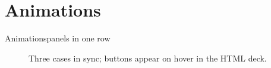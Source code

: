 \section{Animations}

\begin{frame}{Animations}{panels in one row}
  \begin{figure}
    \begin{animation}[fps=4, frames=0:22:2, dt=0.1, timebar, controls=hover]
    \end{animation}
    \caption{Three cases in sync; buttons appear on hover in the HTML deck.}
  \end{figure}
\end{frame}

